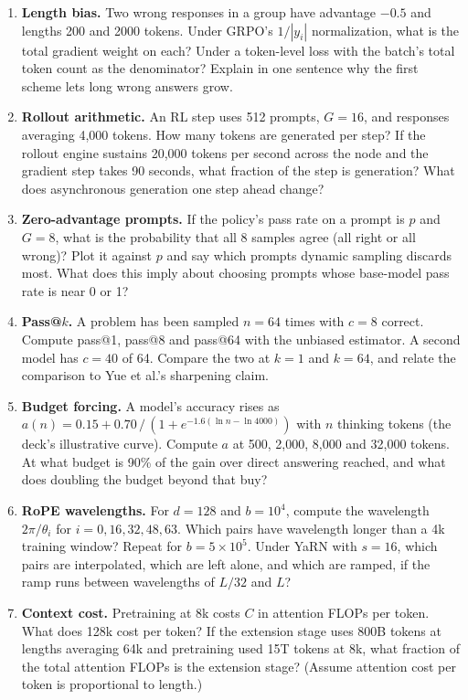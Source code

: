 \documentclass[11pt,letterpaper]{article}
\begin{document}
\begin{enumerate}[leftmargin=1.6em,itemsep=6pt]
\item \textbf{Length bias.} Two wrong responses in a group have advantage $-0.5$ and lengths 200 and 2000 tokens. Under GRPO's $1/|y_i|$ normalization, what is the total gradient weight on each? Under a token-level loss with the batch's total token count as the denominator? Explain in one sentence why the first scheme lets long wrong answers grow.
\item \textbf{Rollout arithmetic.} An RL step uses 512 prompts, $G=16$, and responses averaging 4,000 tokens. How many tokens are generated per step? If the rollout engine sustains 20,000 tokens per second across the node and the gradient step takes 90 seconds, what fraction of the step is generation? What does asynchronous generation one step ahead change?
\item \textbf{Zero-advantage prompts.} If the policy's pass rate on a prompt is $p$ and $G=8$, what is the probability that all 8 samples agree (all right or all wrong)? Plot it against $p$ and say which prompts dynamic sampling discards most. What does this imply about choosing prompts whose base-model pass rate is near 0 or 1?
\item \textbf{Pass@$k$.} A problem has been sampled $n=64$ times with $c=8$ correct. Compute pass@1, pass@8 and pass@64 with the unbiased estimator. A second model has $c=40$ of 64. Compare the two at $k=1$ and $k=64$, and relate the comparison to Yue et al.'s sharpening claim.
\item \textbf{Budget forcing.} A model's accuracy rises as $a(n)=0.15+0.70\,/\,(1+e^{-1.6(\ln n-\ln 4000)})$ with $n$ thinking tokens (the deck's illustrative curve). Compute $a$ at 500, 2,000, 8,000 and 32,000 tokens. At what budget is 90\% of the gain over direct answering reached, and what does doubling the budget beyond that buy?
\item \textbf{RoPE wavelengths.} For $d=128$ and $b=10^4$, compute the wavelength $2\pi/\theta_i$ for $i=0,16,32,48,63$. Which pairs have wavelength longer than a 4k training window? Repeat for $b=5\times10^5$. Under YaRN with $s=16$, which pairs are interpolated, which are left alone, and which are ramped, if the ramp runs between wavelengths of $L/32$ and $L$?
\item \textbf{Context cost.} Pretraining at 8k costs $C$ in attention FLOPs per token. What does 128k cost per token? If the extension stage uses 800B tokens at lengths averaging 64k and pretraining used 15T tokens at 8k, what fraction of the total attention FLOPs is the extension stage? (Assume attention cost per token is proportional to length.)

\end{enumerate}
\end{document}
